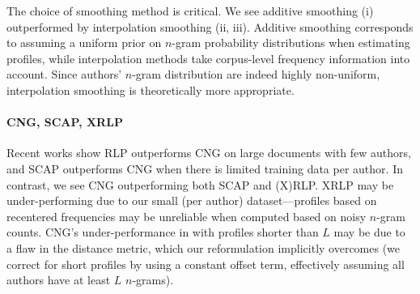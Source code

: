 \documentclass[twocolumn,10pt]{article}
\begin{document}
The choice of smoothing method is critical.
We see additive smoothing (i) outperformed by interpolation
smoothing (ii, iii).
Additive smoothing corresponds to assuming a uniform prior
on $n$-gram probability distributions when estimating profiles,
while interpolation methods take corpus-level frequency
information into account.
Since authors' $n$-gram distribution are indeed highly
non-uniform, interpolation smoothing is theoretically
more appropriate.


\paragraph{CNG, SCAP, XRLP} Recent works show RLP outperforms CNG
on large documents with few authors\supercite{layton2012recentred},
and SCAP outperforms CNG when there is limited training data per
author\supercite{frantzeskou2006effective}.
In contrast, we see CNG outperforming both SCAP and (X)RLP.
XRLP may be under-performing due to our small (per author)
dataset---profiles based on recentered frequencies may be unreliable
when computed based on noisy $n$-gram counts.
CNG's under-performance in \cite{frantzeskou2006effective} with profiles
shorter than $L$ may be due to a flaw in the distance metric, which
our reformulation implicitly overcomes (we correct for short profiles by
using a constant offset term, effectively assuming all authors have at least $L$ $n$-grams).

\end{document}
